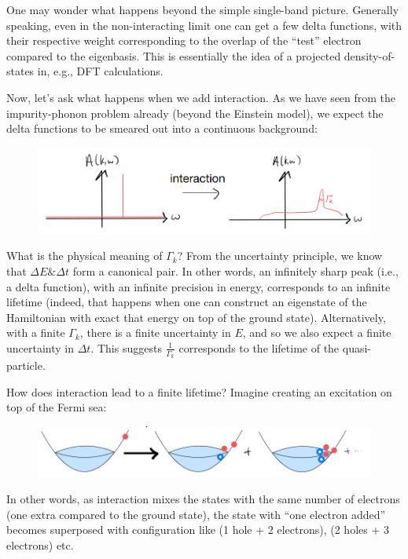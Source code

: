 One may wonder what happens beyond the simple single-band picture. Generally speaking, even in the non-interacting limit one can get a few delta functions, with their respective weight corresponding to the overlap of the ``test'' electron compared to the eigenbasis. This is essentially the idea of a projected density-of-states in, e.g., DFT calculations.

Now, let's ask what happens when we add interaction. As we have seen from the impurity-phonon problem already (beyond the Einstein model), we expect the delta functions to be smeared out into a continuous background:

\begin{figure}[ht]
    \centering
    \includegraphics[width=\textwidth]{jupyterbook/data/fig/lec16-fig02.png}
\end{figure}

What is the physical meaning of $\Gamma_k$? From the uncertainty principle, we know that $\Delta E \& \Delta t$ form a canonical pair. In other words, an infinitely sharp peak (i.e., a delta function), with an infinite precision in energy, corresponds to an infinite lifetime (indeed, that happens when one can construct an eigenstate of the Hamiltonian with exact that energy on top of the ground state). Alternatively, with a finite $\Gamma_k$, there is a finite uncertainty in $E$, and so we also expect a finite uncertainty in $\Delta t$. This suggests $\frac{1}{\Gamma_k}$ corresponds to the lifetime of the quasi-particle.

How does interaction lead to a finite lifetime? Imagine creating an excitation on top of the Fermi sea:

\begin{figure}[ht]
    \centering
    \includegraphics[width=\textwidth]{jupyterbook/data/fig/lec16-fig03.png}
\end{figure}

In other words, as interaction mixes the states with the same number of electrons (one extra compared to the ground state), the state with ``one electron added'' becomes superposed with configuration like (1 hole + 2 electrons), (2 holes + 3 electrons) etc.

